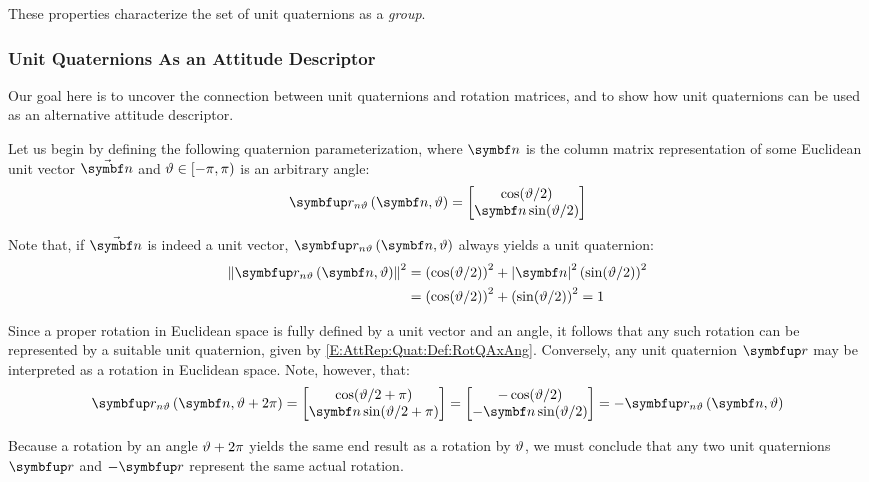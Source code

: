 These properties characterize the set of unit quaternions as a \emph{group}.

\subsubsection{Unit Quaternions As an Attitude Descriptor}
Our goal here is to uncover the connection between unit quaternions and rotation matrices, and to show how unit quaternions can be used as an alternative attitude descriptor. %

Let us begin by defining the following quaternion parameterization, where $\mcol{n}$ is the column matrix representation of some Euclidean unit vector $\vabs{n}$ and $\vartheta \in \left[-\pi, \pi \right)$ is an arbitrary angle:
\begin{equation} \label{E:AttRep:Quat:Def:RotQAxAng}
\RotQAxAng{\mcol{\rotax}}{\rotang} = \qcol{\cos (\rotang/2)}{\mcol{\rotax} \sin (\rotang/2)}
\end{equation}

Note that, if $\vabs{n}$ is indeed a unit vector, $\RotQAxAng{\mcol{\rotax}}{\rotang}$ always yields a unit quaternion:
\begin{equation} \label{E:AttRep:Quat:Res:RotQAxAngUnit}
\begin{split}
\qnorm{\RotQAxAng{\mcol{\rotax}}{\rotang}}^2 &= {\left(\cos (\rotang/2)\right)}^2 + \norm{\mcol{\rotax}}^2 {\left(\sin (\rotang/2)\right)}^2 \\
&= {\left(\cos (\rotang/2)\right)}^2 + {\left(\sin (\rotang/2)\right)}^2 = 1
\end{split}
\end{equation}

Since a proper rotation in Euclidean space is fully defined by a unit vector and an angle, it follows that any such rotation can be represented by a suitable unit quaternion, given by \eqref{E:AttRep:Quat:Def:RotQAxAng}. Conversely, any unit quaternion $\quat{\rotq}$ may be interpreted as a rotation in Euclidean space. Note, however, that:
\begin{equation} \label{E:AttRep:Quat:Res:DoubleCover}
\RotQAxAng{\mcol{\rotax}}{\rotang+2\pi} = \qcol{\cos (\rotang/2+\pi)}{\mcol{\rotax} \sin (\rotang/2+\pi)} = \qcol{-\cos (\rotang/2)}{-\mcol{\rotax} \sin (\rotang/2)} = -\RotQAxAng{\mcol{\rotax}}{\rotang}
\end{equation}

Because a rotation by an angle $\vartheta + 2\pi$ yields the same end result as a rotation by $\vartheta$, we must conclude that any two unit quaternions $\quat{\rotq}$ and $-\quat{\rotq}$ represent the same actual rotation.

